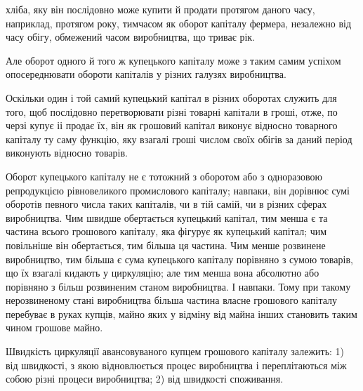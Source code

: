 \parcont{}  %
хліба, яку він послідовно може купити й продати протягом даного
часу, наприклад, протягом року, тимчасом як оборот капіталу
фермера, незалежно від часу обігу, обмежений часом
виробництва, що триває рік.

Але оборот одного й того ж купецького капіталу може з таким
самим успіхом опосереднювати обороти капіталів у різних
галузях виробництва.

Оскільки один і той самий купецький капітал в різних оборотах
служить для того, щоб послідовно перетворювати різні
товарні капітали в гроші, отже, по черзі купує іі продає їх, він
як грошовий капітал виконує відносно товарного капіталу ту
саму функцію, яку взагалі гроші числом своїх обігів за даний
період виконують відносно товарів.

Оборот купецького капіталу не є тотожний з оборотом або
з одноразовою репродукцією рівновеликого промислового капіталу;
навпаки, він дорівнює сумі оборотів певного числа таких
капіталів, чи в тій самій, чи в різних сферах виробництва. Чим
швидше обертається купецький капітал, тим менша є та частина
всього грошового капіталу, яка фігурує як купецький капітал;
чим повільніше він обертається, тим більша ця частина. Чим
менше розвинене виробництво, тим більша є сума купецького
капіталу порівняно з сумою товарів, що їх взагалі кидають у циркуляцію;
але тим менша вона абсолютно або порівняно з більш
розвиненим станом виробництва. І навпаки. Тому при такому
нерозвиненому стані виробництва більша частина власне грошового
капіталу перебуває в руках купців, майно яких у відміну
від майна інших становить таким чином грошове майно.

Швидкість циркуляції авансовуваного купцем грошового
капіталу залежить: 1) від швидкості, з якою відновлюється
процес виробництва і переплітаються між собою різні процеси
виробництва; 2) від швидкості споживання.

